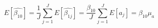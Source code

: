 \begin{equation}
\label{avgest}
E[\hat{\beta_{10}}] = \frac{1}{J}\sum\limits_{j=1}^J{E[\hat{\beta_{1j}}]} = \frac{\beta_{10}}{J}\sum\limits_{j=1}^J{E[a_j]} = \beta_{10}\mu_{a}
\end{equation}